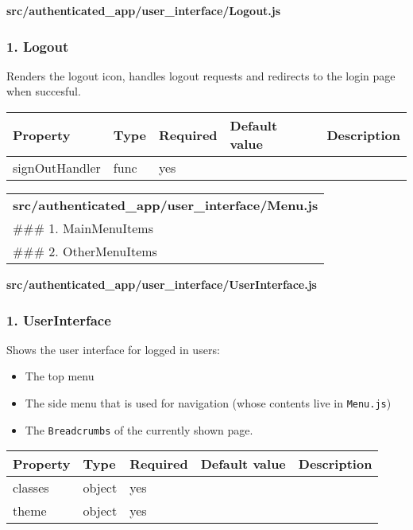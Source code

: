 \textbf{src/authenticated\_app/user\_interface/Logout.js}

\hypertarget{logout}{%
\subsubsection{1. Logout}\label{logout}}

Renders the logout icon, handles logout requests and redirects to the
login page when succesful.

\begin{longtable}[]{@{}lllll@{}}
\toprule
Property & Type & Required & Default value & Description\tabularnewline
\midrule
\endhead
signOutHandler & func & yes & &\tabularnewline
\bottomrule
\end{longtable}

\begin{longtable}[]{@{}l@{}}
\toprule
\endhead
\begin{minipage}[t]{0.08\columnwidth}\raggedright
\textbf{src/authenticated\_app/user\_interface/Menu.js}\strut
\end{minipage}\tabularnewline
\begin{minipage}[t]{0.08\columnwidth}\raggedright
\#\#\# 1. MainMenuItems\strut
\end{minipage}\tabularnewline
\begin{minipage}[t]{0.08\columnwidth}\raggedright
\#\#\# 2. OtherMenuItems\strut
\end{minipage}\tabularnewline
\bottomrule
\end{longtable}

\textbf{src/authenticated\_app/user\_interface/UserInterface.js}

\hypertarget{userinterface}{%
\subsubsection{1. UserInterface}\label{userinterface}}

Shows the user interface for logged in users:

\begin{itemize}
\tightlist
\item
  The top menu
\item
  The side menu that is used for navigation (whose contents live in
  \texttt{Menu.js})
\item
  The \texttt{Breadcrumbs} of the currently shown page.
\end{itemize}

\begin{longtable}[]{@{}lllll@{}}
\toprule
Property & Type & Required & Default value & Description\tabularnewline
\midrule
\endhead
classes & object & yes & &\tabularnewline
theme & object & yes & &\tabularnewline
\bottomrule
\end{longtable}

